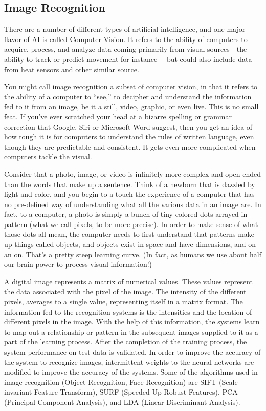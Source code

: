\documentclass[12pt,a4paper]{article}
\begin{document}
\subsection{Image Recognition}
There are a number of different types of artificial intelligence, and one major flavor of AI is called Computer Vision. It refers to the ability of computers to acquire, process, and analyze data coming primarily from visual sources—the ability to track or predict movement for instance— but could also include data from heat sensors and other similar source.
\par
You might call image recognition a subset of computer vision, in that it refers to the ability of a computer to “see,” to decipher and understand the information fed to it from an image, be it a still, video, graphic, or even live. This is no small feat. If you’ve ever scratched your head at a bizarre spelling or grammar correction that Google, Siri or Microsoft Word suggest, then you get an idea of how tough it is for computers to understand the rules of written language, even though they are predictable and consistent. It gets even more complicated when computers tackle the visual.
\par 
Consider that a photo, image, or video is infinitely more complex and open-ended than the words that make up a sentence. Think of a newborn that is dazzled by light and color, and you begin to a touch the experience of a computer that has no pre-defined way of understanding what all the various data in an image are. In fact, to a computer, a photo is simply a bunch of tiny colored dots arrayed in pattern (what we call pixels, to be more precise). In order to make sense of what those dots all mean, the computer needs to first understand that patterns make up things called objects, and objects exist in space and have dimensions, and on an on. That’s a pretty steep learning curve. (In fact, as humans we use about half our brain power to process visual information!)
\newpage

\par A digital image represents a matrix of numerical values. These values represent the data associated with the pixel of the image. The intensity of the different pixels, averages to a single value, representing itself in a matrix format. The information fed to the recognition systems is the intensities and the location of different pixels in the image. With the help of this information, the systems learn to map out a relationship or pattern in the subsequent images supplied to it as a part of the learning process. After the completion of the training process, the system performance on test data is validated. In order to improve the accuracy of the system to recognize images, intermittent weights to the neural networks are modified to improve the accuracy of the systems. Some of the algorithms used in image recognition (Object Recognition, Face Recognition) are SIFT (Scale-invariant Feature Transform), SURF (Speeded Up Robust Features), PCA (Principal Component Analysis), and LDA (Linear Discriminant Analysis).
\end{document}
